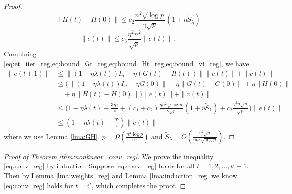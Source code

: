 \begin{proof}
\begin{equation}\label{eq:bound_Ht_reg}
    \|H(t)-H(0)\| \leq c_2\frac{n^2\sqrt{\log p}}{\gamma\sqrt p}(1+\eta \tilde{S}_\lambda)
\end{equation}
\begin{equation}\label{eq:bound_vt_reg}
    \|v(t)\| \leq c_3\frac{\eta^2n^2}{\sqrt p}\|e(t)\|.
\end{equation}
Combining \cref{eq:et_iter_reg,eq:bound_Gt_reg,eq:bound_Ht_reg,eq:bound_vt_reg}, we have
\begin{equation*}
\begin{aligned}
\|e(t+1)\|
&\leq \|(1-\eta\lambda(t))I_n-\eta (G(t)+H(t))\|\|e(t)\|+\|v(t)\| \\
&\leq \Big(\|(1-\eta\lambda(t))I_n-\eta G(0)\|+\eta\|G(t)-G(0)\|+\eta\|H(0)\| \\
&\quad +\eta\|H(t)-H(0)\|\Big)\|e(t)\| + \|v(t)\| \\
&\leq \Big( 1-\eta\lambda(t)-\frac{3\eta\gamma}{4}+(c_1+ c_2)\frac{\eta n^2\sqrt{\log p}}{\gamma\sqrt p}(1+\eta \tilde{S}_\lambda)+c_3\frac{\eta^2n\sqrt n}{\sqrt p}\Big)\|e(t)\|  \\
&\leq(1-\eta\lambda(t)-\frac{\eta\gamma}{4})\|e(t)\|
\end{aligned}
\end{equation*}
where we use Lemma \ref{lma:GH}, $p=\Omega(\frac{n^4\log p}{\gamma^4})$ and $\tilde{S}_\lambda = O(\frac{\gamma^2\sqrt{p}}{\eta n^2\sqrt{\log p}})$.
\end{proof}

\begin{proof}[Proof of Theorem \ref{thm:nonlinear_conv_reg}]
We prove the inequality \eqref{eq:conv_reg} by induction. Suppose \eqref{eq:conv_reg} holds for all $t=1,2,...,t'-1$. Then by Lemma \ref{lma:weights_reg} and Lemma \ref{lma:induction_reg} we know \eqref{eq:conv_reg} holds for $t=t'$, which completes the proof.
\end{proof}
